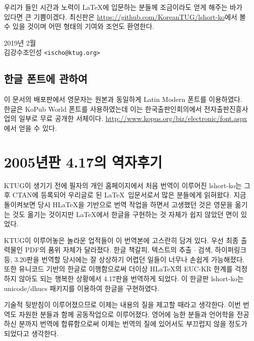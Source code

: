 우리가 들인 시간과 노력이 \LaTeX 에 입문하는 분들께 조금이라도 얻게 해주는 바가 있다면 
큰 기쁨이겠다. 
최신판은 \url{https://github.com/KoreanTUG/lshort-ko}에서 볼 수 있을 것이며
어떤 형태의 기여와 조언도 환영한다.

{\flushright 2019년 2월 \\
김강수\cntrdot 조인성 \texttt{<ischo@ktug.org>} \par
}


\subsection*{한글 폰트에 관하여}

이 문서의 배포판에서 영문자는 원본과 동일하게 Latin Modern 폰트를 이용하였다.
한글은 KoPub World 폰트를 사용하였는데 이는 한국출판인회의에서 전자출판진흥사업의 일부로 
무료 공개한 서체이다. \url{http://www.kopus.org/biz/electronic/font.aspx}에서 
얻을 수 있다.

\section*{2005년판 4.17의 역자후기}

KTUG이 생기기 전에 필자의 개인 홈페이지에서 처음 번역이 이루어진 lshort-ko는
그 후 CTAN에 등록되어 우리글로 된 \LaTeX\ 입문서로서 많은 분들에게 읽혀왔다.
지금 돌이켜보면 당시 H\LaTeX 을 기반으로 번역 작업을 하면서 고생했던 것은
영문을 옮기는 것도 옮기는 것이지만 \LaTeX 에서 한글을 구현하는 것 자체가
쉽지 않았던 면이 있었다.

KTUG이 이루어놓은 놀라운 업적들이 이 번역본에 고스란히 담겨 있다. 우선 
최종 출력물인 PDF의 품위 자체가 달라졌다. 한글 책갈피, 텍스트의 추출 $\cdot$
검색, 하이퍼링크 등, 3.20판을 번역할 당시에는 잘 상상하기 어렵던 일들이
너무나 손쉽게 가능해졌다. 또한 유니코드 기반의 한글로 이행함으로써
더이상 H\LaTeX 의 EUC-KR 한계를 걱정하지 않아도 되는 행복한 상황에서
4.17판을 번역하게 되었다. 이 한글판 lshort-ko는 \textsf{unicode/dhucs} 패키지를
이용하여 한글을 구현하였다.

기술적 뒷받침이 이루어졌으므로 이제는 내용의 질을 제고할 때라고 생각한다.
이번 번역도 자원한 분들과 함께 공동작업으로 이루어졌다. 영어에 능한
분들과 언어학을 전공하신 분까지 번역에 합류함으로써 이제는 번역의 질에
있어서도 부끄럽지 않을 정도가 되었다고 생각한다.

